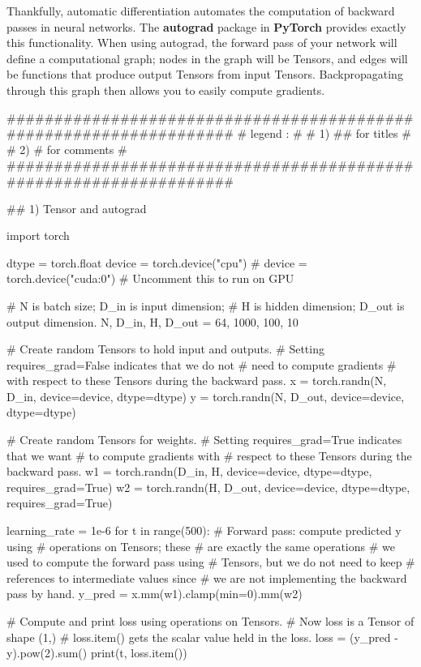 \documentclass[11pt]{article}
\begin{document}
Thankfully,  automatic differentiation  automates the computation of backward passes in neural networks. The \textbf{autograd} package in \textbf{PyTorch} provides exactly this functionality. When using autograd, the forward pass of your network will define a computational graph; nodes in the graph will be Tensors, and edges will be functions that produce output Tensors from input Tensors. Backpropagating through this graph then allows you to easily compute gradients.
\begin{python}
###################################################################
# legend :                                                        #
#         1) ## for titles                                        #
#         2) #  for comments                                      #
###################################################################   

## 1) Tensor and autograd

import torch

dtype = torch.float
device = torch.device("cpu")
# device = torch.device("cuda:0") # Uncomment this to run on GPU

# N is batch size; D_in is input dimension;
# H is hidden dimension; D_out is output dimension.
N, D_in, H, D_out = 64, 1000, 100, 10

# Create random Tensors to hold input and outputs.
# Setting requires_grad=False indicates that we do not 
# need to compute gradients
# with respect to these Tensors during the backward pass.
x = torch.randn(N, D_in, device=device, dtype=dtype)
y = torch.randn(N, D_out, device=device, dtype=dtype)

# Create random Tensors for weights.
# Setting requires_grad=True indicates that we want 
# to compute gradients with
# respect to these Tensors during the backward pass.
w1 = torch.randn(D_in, H, device=device, dtype=dtype,
                 requires_grad=True)
w2 = torch.randn(H, D_out, device=device, dtype=dtype,
                 requires_grad=True)

learning_rate = 1e-6
for t in range(500):
    # Forward pass: compute predicted y using 
    # operations on Tensors; these
    # are exactly the same operations 
    # we used to compute the forward pass using
    # Tensors, but we do not need to keep 
    # references to intermediate values since
    # we are not implementing the backward pass by hand.
    y_pred = x.mm(w1).clamp(min=0).mm(w2)

    # Compute and print loss using operations on Tensors.
    # Now loss is a Tensor of shape (1,)
    # loss.item() gets the scalar value held in the loss.
    loss = (y_pred - y).pow(2).sum()
    print(t, loss.item())


\end{python}
\end{document}
